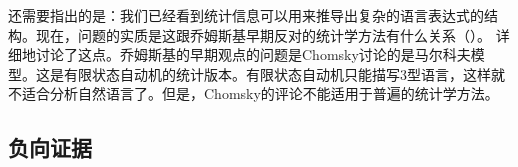 还需要指出的是：我们已经看到统计信息可以用来推导出复杂的语言表达式的结构。现在，问题的实质是这跟乔姆斯基早期反对的统计学方法有什么关系（\citealp[]{Chomsky57a}）。 \citet[\S~4.2]{Abney96a}详细地讨论了这点。乔姆斯基的早期观点的问题是Chomsky讨论的是马尔科夫模型。这是有限状态自动机的统计版本。有限状态自动机只能描写3型语言，这样就不适合分析自然语言了。但是，Chomsky的评论不能适用于普遍的统计学方法。

\subsection{负向证据}
\label{Abschnitt-negative-Evidenz}

